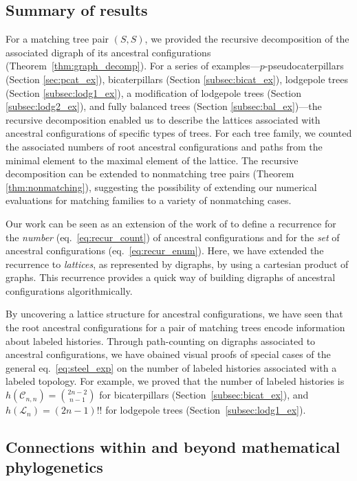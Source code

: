 \documentclass[10pt]{article}
\begin{document}
\subsection{Summary of results}

For a matching tree pair $(S,S)$, we provided the recursive decomposition of the associated digraph of its ancestral configurations (Theorem~\ref{thm:graph_decomp}). For a series of examples---$p$-pseudocaterpillars (Section \ref{sec:pcat_ex}), bicaterpillars (Section \ref{subsec:bicat_ex}), lodgepole trees (Section \ref{subsec:lodg1_ex}), a modification of lodgepole trees (Section \ref{subsec:lodg2_ex}), and fully balanced trees (Section \ref{subsec:bal_ex})---the recursive decomposition enabled us to describe the lattices associated with ancestral configurations of specific types of trees. For each tree family, we counted the associated numbers of root ancestral configurations and paths from the minimal element to the maximal element of the lattice. The recursive decomposition can be extended to nonmatching tree pairs (Theorem \ref{thm:nonmatching}), suggesting the possibility of extending our numerical evaluations for matching families to a variety of nonmatching cases.

Our work can be seen as an extension of the work of \cite{disanto2017enumeration} to define a recurrence for the \emph{number} (eq.~\ref{eq:recur_count}) of ancestral configurations and for the \emph{set} of ancestral configurations (eq.~\ref{eq:recur_enum}). Here, we have extended the recurrence to \emph{lattices}, as represented by digraphs, by using a cartesian product of graphs. This recurrence provides a quick way of building digraphs of ancestral configurations algorithmically. 

By uncovering a lattice structure for ancestral configurations, we have seen that the root ancestral configurations for a pair of matching trees encode information about labeled histories. Through path-counting on digraphs associated to ancestral configurations, we have obained visual proofs of special cases of the general eq.~\ref{eq:steel_exp} on the number of labeled histories associated with a labeled topology. For example, we proved that the number of labeled histories is $h(\mathcal C_{n,n}) = \binom{2n-2}{n-1}$ for bicaterpillars (Section~\ref{subsec:bicat_ex}), and $h(\mathcal L_n) = (2n-1)!!$ for lodgepole trees (Section~\ref{subsec:lodg1_ex}).  

\subsection{Connections within and beyond mathematical phylogenetics}
\end{document}

